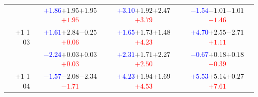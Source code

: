 \documentclass[compress]{beamer}
\begin{document}
\begin{frame}
\begin{tabular}{r | c | c | c}
          & \textcolor{blue}{$+1.86$}\hspace{0.1 cm}$+1.95$\hspace{0.1 cm}$+1.95$\hspace{0.1 cm}\textcolor{red}{$+1.95$} & \textcolor{blue}{$+3.10$}\hspace{0.1 cm}$+1.92$\hspace{0.1 cm}$+2.47$\hspace{0.1 cm}\textcolor{red}{$+3.79$} & \textcolor{blue}{$-1.54$}\hspace{0.1 cm}$-1.01$\hspace{0.1 cm}$-1.01$\hspace{0.1 cm}\textcolor{red}{$-1.46$} \\
$+$1 1 03 & \textcolor{blue}{$+1.61$}\hspace{0.1 cm}$+2.84$\hspace{0.1 cm}$-0.25$\hspace{0.1 cm}\textcolor{red}{$+0.06$} & \textcolor{blue}{$+1.65$}\hspace{0.1 cm}$+1.73$\hspace{0.1 cm}$+1.48$\hspace{0.1 cm}\textcolor{red}{$+4.23$} & \textcolor{blue}{$+4.70$}\hspace{0.1 cm}$+2.55$\hspace{0.1 cm}$-2.71$\hspace{0.1 cm}\textcolor{red}{$+1.11$} \\
          & \textcolor{blue}{$-2.24$}\hspace{0.1 cm}$+0.03$\hspace{0.1 cm}$+0.03$\hspace{0.1 cm}\textcolor{red}{$+0.03$} & \textcolor{blue}{$+2.31$}\hspace{0.1 cm}$+1.71$\hspace{0.1 cm}$+2.27$\hspace{0.1 cm}\textcolor{red}{$+2.50$} & \textcolor{blue}{$-0.67$}\hspace{0.1 cm}$+0.18$\hspace{0.1 cm}$+0.18$\hspace{0.1 cm}\textcolor{red}{$-0.39$} \\
$+$1 1 04 & \textcolor{blue}{$-1.57$}\hspace{0.1 cm}$-2.08$\hspace{0.1 cm}$-2.34$\hspace{0.1 cm}\textcolor{red}{$-1.71$} & \textcolor{blue}{$+4.23$}\hspace{0.1 cm}$+1.94$\hspace{0.1 cm}$+1.69$\hspace{0.1 cm}\textcolor{red}{$+4.53$} & \textcolor{blue}{$+5.53$}\hspace{0.1 cm}$+5.14$\hspace{0.1 cm}$+0.27$\hspace{0.1 cm}\textcolor{red}{$+7.61$} \\

\end{tabular}
\end{frame}
\end{document}
